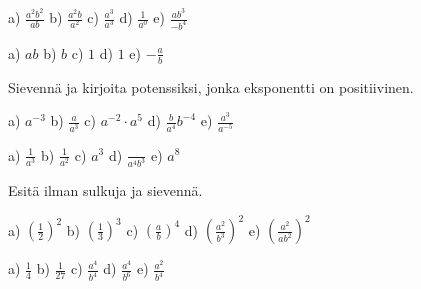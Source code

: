     \begin{tehtava}
        a) $\frac{a^2b^2}{ab}$ \qquad
        b) $\frac{a^2b}{a^2}$ \qquad
        c) $\frac{a^3}{a^3}$ \qquad
        d) $\frac{1}{a^0}$ \qquad
        e) $\frac{ab^3}{-b^4}$
        
        \begin{vastaus}
            a) $ab$ \qquad
            b) $b$ \qquad
            c) $1$ \qquad
            d) $1$ \qquad
            e) $-\frac{a}{b}$
        \end{vastaus}
    \end{tehtava}
    
    Sievennä ja kirjoita potenssiksi, jonka eksponentti on positiivinen.
    
    \begin{tehtava}
        a) $a^{-3}$ \qquad
        b) $\frac{a}{a^3}$ \qquad
        c) $a^{-2}\cdot a^5$ \qquad
        d) $\frac{b}{a^4}b^{-4}$ \qquad
        e) $\frac{a^3}{a^{-5}}$
        
        \begin{vastaus}
            a) $\frac{1}{a^3}$ \qquad
            b) $\frac{1}{a^2}$ \qquad
            c) $a^3$ \qquad
            d) $\frac{}{a^4b^3}$ \qquad
            e) $a^8$
        \end{vastaus}
    \end{tehtava}
    
    Esitä ilman sulkuja ja sievennä.
    
    \begin{tehtava}
        a) $(\frac{1}{2})^2$ \qquad
        b) $(\frac{1}{3})^3$ \qquad
        c) $(\frac{a}{b})^4$ \qquad
        d) $(\frac{a^2}{b^3})^2$ \qquad
        e) $\left(\frac{a^2}{ab^2}\right)^2$
        
        \begin{vastaus}
            a) $\frac{1}{4}$ \qquad
            b) $\frac{1}{27}$ \qquad
            c) $\frac{a^4}{b^4}$ \qquad
            d) $\frac{a^4}{b^6}$ \qquad
            e) $\frac{a^2}{b^4}$
        \end{vastaus}
    \end{tehtava}
    
